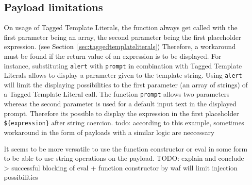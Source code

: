 \subsection{Payload limitations}
On usage of Tagged Template Literals, the function always get called with the first parameter being an array, the second parameter being the first placeholder expression. (see Section~\ref{sec:taggedtemplateliterals}) Therefore, a workaround must be found if the return value of an expression is to be displayed. For instance, substituting \verb|alert| with \verb|prompt| in combination with Tagged Template Literals allows to display a parameter given to the template string. Using \verb|alert| will limit the displaying possibilities to the first parameter (an array of strings) of a Tagged Template Literal call. The function \verb|prompt| allows two parameters whereas the second parameter is used for a default input text in the displayed prompt. \cite{js/prompt} Therefore its possible to display the expression in the first placeholder \verb|${expression}| after string coercion. {\color{red} todo: according to this example, sometimes workaround in the form of payloads with a similar logic are neccessary}

It seems to be more versatile to use the function constructor or eval in some form to be able to use string operations on the payload. {\color{red} TODO: explain and conclude -> successful blocking of eval + function constructor by waf will limit injection possibilities}

